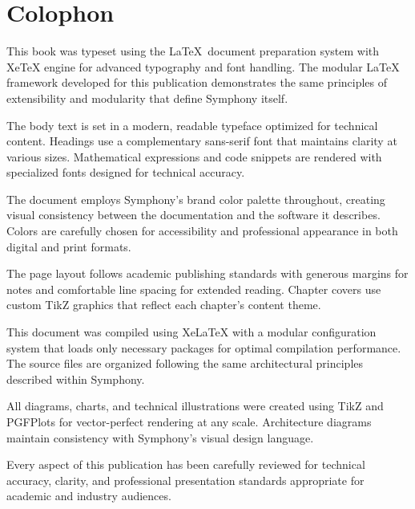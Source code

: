 
\section*{Colophon}

\vspace{1cm}

This book was typeset using the \LaTeX\ document preparation system with XeTeX engine for advanced typography and font handling. The modular LaTeX framework developed for this publication demonstrates the same principles of extensibility and modularity that define Symphony itself.

\vspace{1cm}

\begin{description}[leftmargin=3cm,labelwidth=2.5cm,itemsep=0.8cm]

\item[\textbf{Typography}] The body text is set in a modern, readable typeface optimized for technical content. Headings use a complementary sans-serif font that maintains clarity at various sizes. Mathematical expressions and code snippets are rendered with specialized fonts designed for technical accuracy.

\item[\textbf{Color System}] The document employs Symphony's brand color palette throughout, creating visual consistency between the documentation and the software it describes. Colors are carefully chosen for accessibility and professional appearance in both digital and print formats.

\item[\textbf{Layout}] The page layout follows academic publishing standards with generous margins for notes and comfortable line spacing for extended reading. Chapter covers use custom TikZ graphics that reflect each chapter's content theme.

\item[\textbf{Production}] This document was compiled using XeLaTeX with a modular configuration system that loads only necessary packages for optimal compilation performance. The source files are organized following the same architectural principles described within Symphony.

\item[\textbf{Graphics}] All diagrams, charts, and technical illustrations were created using TikZ and PGFPlots for vector-perfect rendering at any scale. Architecture diagrams maintain consistency with Symphony's visual design language.

\item[\textbf{Quality}] Every aspect of this publication has been carefully reviewed for technical accuracy, clarity, and professional presentation standards appropriate for academic and industry audiences.

\end{description}

